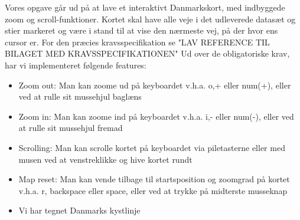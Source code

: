 Vores opgave går ud på at lave et interaktivt Danmarkskort, med indbyggede zoom og scroll-funktioner. Kortet skal have alle veje i det udleverede datasæt og stier markeret og være i stand til at vise den nærmeste vej, på der hvor ens cursor er. For den præcies kravsspecifikation se "LAV REFERENCE TIL BILAGET MED KRAVSSPECIFIKATIONEN"
\newline \newline
Ud over de obligatoriske krav, har vi implementeret følgende features:
\begin{itemize}
	\item{Zoom out: Man kan zoome ud på keyboardet v.h.a. o,+ eller num(+), eller ved at rulle sit mussehjul baglæns}
	\item{Zoom in: Man kan zoome ind på keyboardet v.h.a. i,- eller num(-), eller ved at rulle sit mussehjul fremad}
	\item{Scrolling: Man kan scrolle kortet på keyboardet via piletasterne eller med musen ved at venstreklikke og hive kortet rundt}
	\item{Map reset: Man kan vende tilbage til startsposition og zoomgrad på kortet v.h.a. r, backspace eller space, eller ved at trykke på midterste musseknap}
	\item{Vi har tegnet Danmarks kystlinje}
\end{itemize}